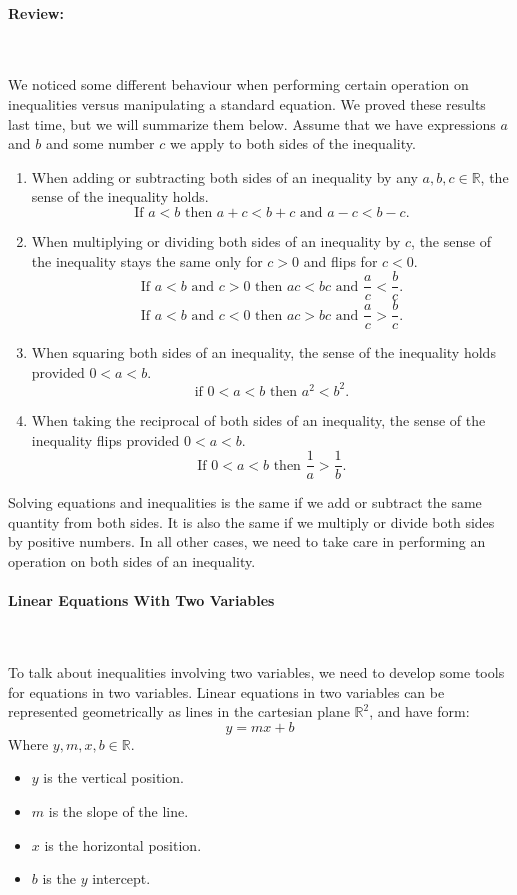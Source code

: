 \documentclass[english,12pt]{article}
\theoremstyle{plain}
\theoremstyle{definition}
\theoremstyle{definition} %
\newcommand{\enum}[1]{\begin{enumerate} #1 \end{enumerate}}
\newcommand{\R}{\mathbb{R}} %
\begin{document}
\paragraph{Review:  }\



We noticed some different behaviour when performing certain operation on inequalities versus manipulating a standard equation.  We proved these results last time, but we will summarize them below.  Assume that we have expressions $a$ and $b$ and some number $c$ we apply to both sides of the inequality.
\enum{
\item When adding or subtracting both sides of an inequality by any $a,b,c\in\R$, the sense of the inequality holds.
\[\text{If } a<b \text{ then } a+c<b+c \text{ and } a-c<b-c.\]

\item When multiplying or dividing both sides of an inequality by $c$, the sense of the inequality stays the same only for $c>0$ and flips for $c<0$.
\[\text{If } a<b\text{ and } c>0 \text{ then } ac<bc \text{ and } \frac{a}{c}<\frac{b}{c}.\]
\[\text{If } a<b\text{ and } c<0 \text{ then } ac>bc \text{ and } \frac{a}{c}>\frac{b}{c}.\]

\item When squaring both sides of an inequality, the sense of the inequality holds provided $0<a<b$.
\[\text{if } 0<a<b \text{ then } a^2<b^2.\]

\item
When taking the reciprocal of both sides of an inequality, the sense of the inequality flips provided $0<a<b$.
\[\text{If } 0<a<b \text{ then } \frac{1}{a}>\frac{1}{b}.\]
}

Solving equations and inequalities is the same if we add or subtract the same quantity from both sides.  It is also the same if we multiply or divide both sides by positive numbers.   In all other cases, we need to take care in performing an operation on both sides of an inequality.\\

\paragraph{Linear Equations With Two Variables}\

To talk about inequalities involving two variables, we need to develop some tools for equations in two variables.  Linear equations in two variables can be represented geometrically as lines in the cartesian plane $\R^2$, and have form:
\[y=mx+b\]
Where $y,m,x,b\in\R$.
\begin{itemize}
\item $y$ is the vertical position.
\item $m$ is the slope of the line.
\item $x$ is the horizontal position.
\item $b$ is the $y$ intercept.
\end{itemize}
\end{document}
